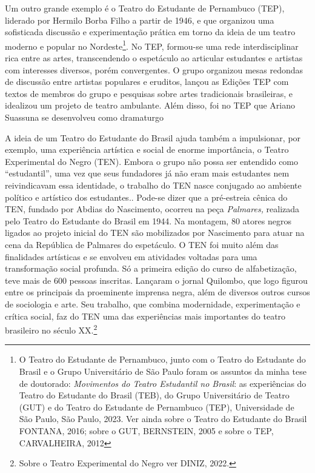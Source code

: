 Um outro grande exemplo é o Teatro do Estudante de Pernambuco (TEP),
liderado por Hermilo Borba Filho a partir de 1946, e que organizou uma
sofisticada discussão e experimentação prática em torno da ideia de um
teatro moderno e popular no Nordeste\footnote{O Teatro do Estudante de
  Pernambuco, junto com o Teatro do Estudante do Brasil e o Grupo
  Universitário de São Paulo foram os assuntos da minha tese de
  doutorado: \textit{Movimentos do Teatro Estudantil no Brasil}: as
  experiências do Teatro do Estudante do Brasil (TEB), do Grupo
  Universitário de Teatro (GUT) e do Teatro do Estudante de Pernambuco
  (TEP), Universidade de São Paulo, São Paulo, 2023. Ver ainda sobre o
  Teatro do Estudante do Brasil FONTANA, 2016; sobre o GUT, BERNSTEIN,
  2005 e sobre o TEP, CARVALHEIRA, 2012}. No TEP, formou-se uma rede
interdisciplinar rica entre as artes, transcendendo o espetáculo ao
articular estudantes e artistas com interesses diversos, porém
convergentes. O grupo organizou mesas redondas de discussão entre
artistas populares e eruditos, lançou as Edições TEP com textos de
membros do grupo e pesquisas sobre artes tradicionais brasileiras, e
idealizou um projeto de teatro ambulante. Além disso, foi no TEP que
Ariano Suassuna se desenvolveu como dramaturgo

A ideia de um Teatro do Estudante do Brasil ajuda também a impulsionar,
por exemplo, uma experiência artística e social de enorme importância, o
Teatro Experimental do Negro (TEN). Embora o grupo não possa ser
entendido como “estudantil”, uma vez que seus fundadores já não eram
mais estudantes nem reivindicavam essa identidade, o trabalho do TEN
nasce conjugado ao ambiente político e artístico dos estudantes..
Pode-se dizer que a pré-estreia cênica do TEN, fundado por Abdias do
Nascimento, ocorreu na peça \textit{Palmares,} realizada pelo Teatro do
Estudante do Brasil em 1944. Na montagem, 80 atores negros ligados ao
projeto inicial do TEN são mobilizados por Nascimento para atuar na cena
da República de Palmares do espetáculo. O TEN foi muito além das
finalidades artísticas e se envolveu em atividades voltadas para uma
transformação social profunda. Só a primeira edição do curso de
alfabetização, teve mais de 600 pessoas inscritas. Lançaram o jornal
Quilombo, que logo figurou entre os principais da proeminente imprensa
negra, além de diversos outros cursos de sociologia e arte. Seu
trabalho, que combina modernidade, experimentação e crítica social, faz
do TEN uma das experiências mais importantes do teatro brasileiro no
século XX.\footnote{Sobre o Teatro Experimental do Negro ver DINIZ,
  2022.}

